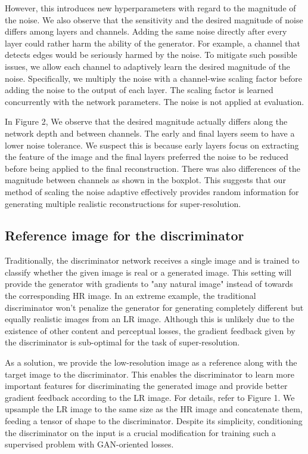 \documentclass{article}
\begin{document}
However, this introduces new hyperparameters with regard to the magnitude of the noise. We also observe that the sensitivity and the desired magnitude of noise differs among layers and channels. Adding the same noise directly after every layer could rather harm the ability of the generator. For example, a channel that detects edges would be seriously harmed by the noise. To mitigate such possible issues, we allow each channel to adaptively learn the desired magnitude of the noise. Specifically, we multiply the noise with a channel-wise scaling factor before adding the noise to the output of each layer. The scaling factor is learned concurrently with the network parameters. The noise is not applied at evaluation.

In Figure 2, We observe that the desired magnitude actually differs along the network depth and between channels. The early and final layers seem to have a lower noise tolerance. We suspect this is because early layers focus on extracting the feature of the image and the final layers preferred the noise to be reduced before being applied to the final reconstruction. There was also differences of the magnitude between channels as shown in the boxplot. This suggests that our method of scaling the noise adaptive effectively provides random information for generating multiple realistic reconstructions for super-resolution.

\subsection{Reference image for the discriminator}

Traditionally, the discriminator network receives a single image and is trained to classify whether the given image is real or a generated image. This setting will provide the generator with gradients to "any natural image" instead of towards the corresponding HR image. In an extreme example, the traditional discriminator won't penalize the generator for generating completely different but equally realistic images from an LR image. Although this is unlikely due to the existence of other content and perceptual losses, the gradient feedback given by the discriminator is sub-optimal for the task of super-resolution. 

As a solution, we provide the low-resolution image as a reference along with the target image to the discriminator. This enables the discriminator to learn more important features for discriminating the generated image and provide better gradient feedback according to the LR image. For details, refer to Figure 1. We upsample the LR image to the same size as the HR image and concatenate them, feeding a tensor of shape  to the discriminator. Despite its simplicity, conditioning the discriminator on the input is a crucial modification for training such a supervised problem with GAN-oriented losses.
\end{document}

